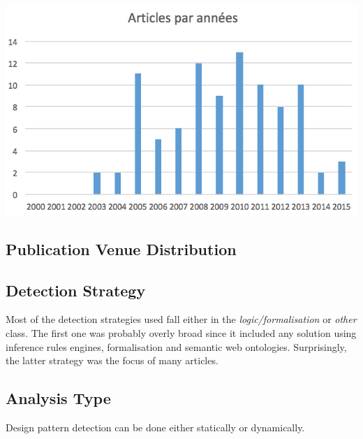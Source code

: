 \documentclass[letterpaper, 10 pt, conference]{ieeeconf}  %
\begin{document}
\begin{center}
\includegraphics[scale=0.75]{articles_by_years.png}
\end{center}


\subsection{Publication Venue Distribution}


\subsection{Detection Strategy}

Most of the detection strategies used fall either in the 
\textit{logic/formalisation} or \textit{other} class.
The first one was probably overly broad since it included any solution using
inference rules engines, formalisation and semantic web ontologies.
Surprisingly, the latter strategy was the focus of many articles. 




\subsection{Analysis Type}

Design pattern detection can be done either statically or dynamically.



\end{document}
